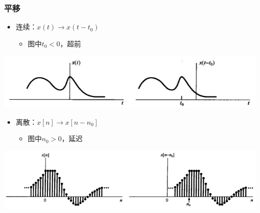 \documentclass[CJKutf8,xcolor=pdftex,dvipsnames,table]{beamer}
\begin{document}
\begin{CJK*}{UTF8}{song}
  \begin{frame}
    \frametitle{平移}
    \begin{itemize}
    \item 连续：$x(t) \rightarrow x(t-t_0)$
        \begin{itemize}
        \item 图中$t_0<0$，超前
        \end{itemize}
    \end{itemize}
    \begin{center}
      \includegraphics[scale=.4]{cshift}
    \end{center}
    \begin{itemize}
    \item 离散：$x[n] \rightarrow x[n-n_0]$    
        \begin{itemize}
        \item 图中$n_0>0$，延迟
        \end{itemize}
    \end{itemize}
    \begin{center}
      \includegraphics[scale=.3]{dshift}
    \end{center}
  \end{frame}  


\end{CJK*}
\end{document}
